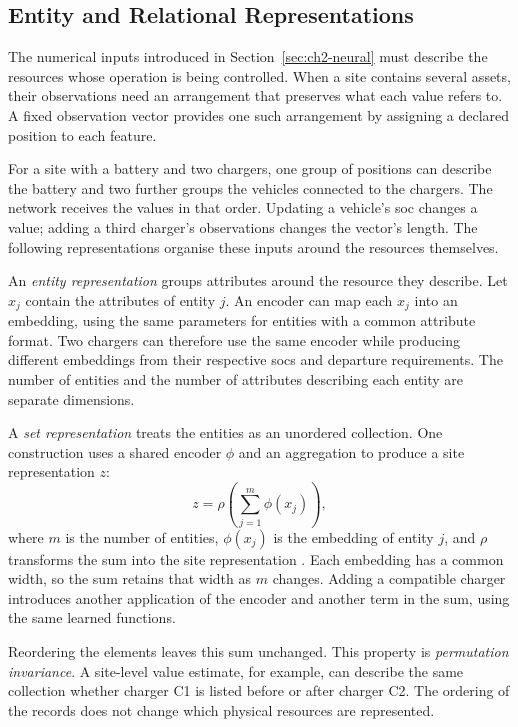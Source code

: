 \subsection{Entity and Relational Representations}
\label{sec:ch2-entities}

The numerical inputs introduced in Section~\ref{sec:ch2-neural} must describe the resources whose operation is being controlled. When a site contains several assets, their observations need an arrangement that preserves what each value refers to. A fixed observation vector provides one such arrangement by assigning a declared position to each feature.

For a site with a battery and two chargers, one group of positions can describe the battery and two further groups the vehicles connected to the chargers. The network receives the values in that order. Updating a vehicle's \gls{soc} changes a value; adding a third charger's observations changes the vector's length. The following representations organise these inputs around the resources themselves.

An \emph{entity representation} groups attributes around the resource they describe. Let $x_j$ contain the attributes of entity $j$. An encoder can map each $x_j$ into an embedding, using the same parameters for entities with a common attribute format. Two chargers can therefore use the same encoder while producing different embeddings from their respective \glspl{soc} and departure requirements. The number of entities and the number of attributes describing each entity are separate dimensions.

A \emph{set representation} treats the entities as an unordered collection. One construction uses a shared encoder $\phi$ and an aggregation to produce a site representation $z$:
\begin{equation}
z=\rho\!\left(\sum_{j=1}^{m}\phi(x_j)\right),
\label{eq:ch2-set-representation}
\end{equation}
where $m$ is the number of entities, $\phi(x_j)$ is the embedding of entity $j$, and $\rho$ transforms the sum into the site representation \parencite{zaheer2017deepsets}. Each embedding has a common width, so the sum retains that width as $m$ changes. Adding a compatible charger introduces another application of the encoder and another term in the sum, using the same learned functions.

Reordering the elements leaves this sum unchanged. This property is \emph{permutation invariance}. A site-level value estimate, for example, can describe the same collection whether charger C1 is listed before or after charger C2. The ordering of the records does not change which physical resources are represented.

